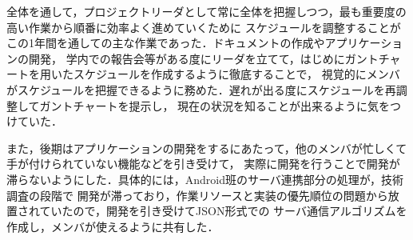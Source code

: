 全体を通して，プロジェクトリーダとして常に全体を把握しつつ，最も重要度の高い作業から順番に効率よく進めていくために
スケジュールを調整することがこの1年間を通しての主な作業であった．ドキュメントの作成やアプリケーションの開発，
学内での報告会等がある度にリーダを立てて，はじめにガントチャートを用いたスケジュールを作成するように徹底することで，
視覚的にメンバがスケジュールを把握できるように務めた．遅れが出る度にスケジュールを再調整してガントチャートを提示し，
現在の状況を知ることが出来るように気をつけていた．

また，後期はアプリケーションの開発をするにあたって，他のメンバが忙しくて手が付けられていない機能などを引き受けて，
実際に開発を行うことで開発が滞らないようにした．具体的には，Android班のサーバ連携部分の処理が，技術調査の段階で
開発が滞っており，作業リソースと実装の優先順位の問題から放置されていたので，開発を引き受けてJSON形式での
サーバ通信アルゴリズムを作成し，メンバが使えるように共有した．

